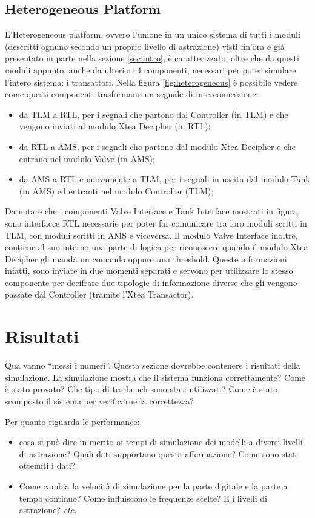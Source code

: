 \documentclass[]{IEEEtran}
\begin{document}
\subsection{Heterogeneous Platform}

L'Heterogeneous platform, ovvero l'unione in un unico sistema di tutti i moduli (descritti ognuno secondo un proprio
livello di astrazione) visti fin'ora e gi\`a presentato in parte nella sezione \ref{sec:intro}, \`e caratterizzato, 
oltre che da questi moduli appunto, anche da ulteriori 4 componenti, necessari per poter simulare l'intero sistema: i transattori. 
Nella figura \ref{fig:heterogeneous} \`e possibile vedere come questi componenti trasformano un segnale di interconnessione:
\begin{itemize}
    \item da TLM a RTL, per i segnali che partono dal Controller (in TLM) e che vengono inviati al modulo Xtea Decipher 
    (in RTL);
    \item da RTL a AMS, per i segnali che partono dal modulo Xtea Decipher e che entrano nel modulo Valve (in AMS);
    \item da AMS a RTL e nuovamente a TLM, per i segnali in uscita dal modulo Tank (in AMS) ed entranti nel modulo 
    Controller (TLM);
\end{itemize}
Da notare che i componenti Valve Interface e Tank Interface mostrati in figura, sono interfacce RTL necessarie per poter 
far comunicare tra loro moduli scritti in TLM, con moduli scritti in AMS e viceversa. Il modulo Valve Interface inoltre,
contiene al suo interno una parte di logica per riconoscere quando il modulo Xtea Decipher gli manda un comando oppure
una threshold. Queste informazioni infatti, sono inviate in due momenti separati e servono per utilizzare lo stesso 
componente per decifrare due tipologie di informazione diverse che gli vengono passate dal Controller (tramite l'Xtea
Transactor).


\section{Risultati}

Qua vanno ``messi i numeri''. Questa sezione dovrebbe contenere i risultati della simulazione. La simulazione mostra che 
il sistema funziona correttamente? Come \`e stato provato? Che tipo di testbench sono stati utilizzati? Come \`e stato 
scomposto il sistema per verificarne la correttezza?

Per quanto riguarda le performance:
\begin{itemize}
\item cosa si pu\`o dire in merito ai tempi di simulazione dei modelli a diversi livelli di astrazione? Quali dati 
supportano questa affermazione? Come sono stati ottenuti i dati?
\item Come cambia la velocit\`a di simulazione per la parte digitale e la parte a tempo continuo? Come influiscono le 
frequenze scelte? E i livelli di astrazione? \emph{etc.}
\end{itemize}
\end{document}
